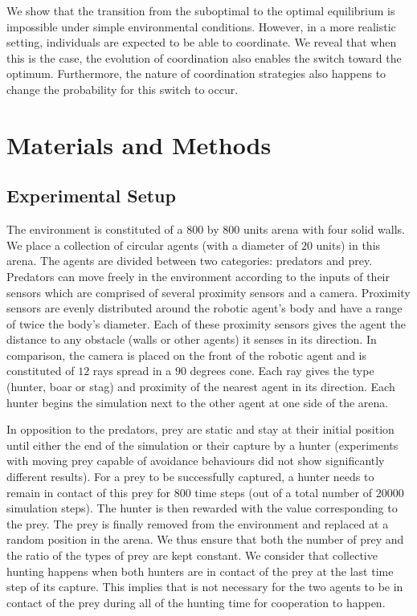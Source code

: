   We show that the transition from the suboptimal to the optimal equilibrium is impossible under simple environmental conditions. However, in a more realistic setting, individuals are expected to be able to coordinate. We reveal that when this is the case, the evolution of coordination also enables the switch toward the optimum. Furthermore, the nature of coordination strategies also happens to change the probability for this switch to occur.


\section{Materials and Methods}
\label{sec:matandmet}
  \subsection{Experimental Setup}
    The environment is constituted of a $800$ by $800$ units arena with four solid walls. We place a collection of circular agents (with a diameter of $20$ units) in this arena. The agents are divided between two categories: predators and prey. Predators can move freely in the environment according to the inputs of their sensors which are comprised of several proximity sensors and a camera. Proximity sensors are evenly distributed around the robotic agent's body and have a range of twice the body's diameter. Each of these proximity sensors gives the agent the distance to any obstacle (walls or other agents) it senses in its direction. In comparison, the camera is placed on the front of the robotic agent and is constituted of $12$ rays spread in a $90$ degrees cone. Each ray gives the type (hunter, boar or stag) and proximity of the nearest agent in its direction. Each hunter begins the simulation next to the other agent at one side of the arena.

    In opposition to the predators, prey are static and stay at their initial position until either the end of the simulation or their capture by a hunter (experiments with moving prey capable of avoidance behaviours did not show significantly different results). For a prey to be successfully captured, a hunter needs to remain in contact of this prey for $800$ time steps (out of a total number of $20000$ simulation steps). The hunter is then rewarded with the value corresponding to the prey. The prey is finally removed from the environment and replaced at a random position in the arena. We thus ensure that both the number of prey and the ratio of the types of prey are kept constant. We consider that collective hunting happens when both hunters are in contact of the prey at the last time step of its capture. This implies that is not necessary for the two agents to be in contact of the prey during all of the hunting time for cooperation to happen.

